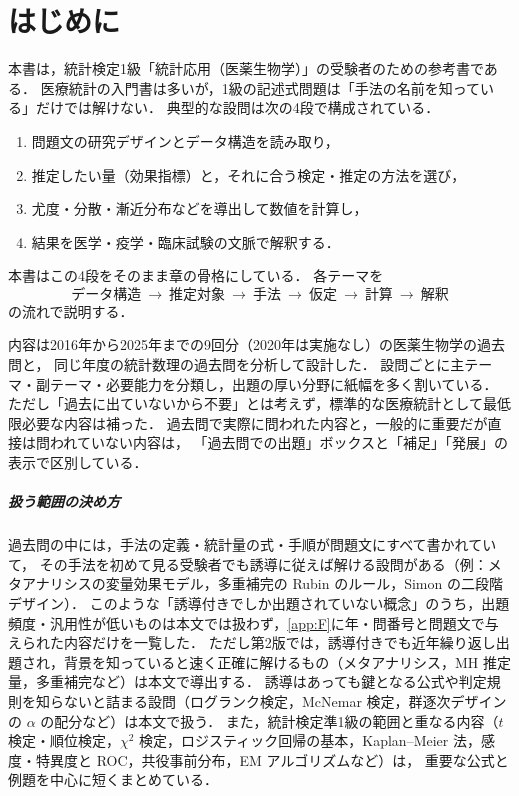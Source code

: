 \chapter*{はじめに}

本書は，統計検定1級「統計応用（医薬生物学）」の受験者のための参考書である．
医療統計の入門書は多いが，1級の記述式問題は「手法の名前を知っている」だけでは解けない．
典型的な設問は次の4段で構成されている．
\begin{enumerate}[label=(\arabic*)]
\item 問題文の研究デザインとデータ構造を読み取り，
\item 推定したい量（効果指標）と，それに合う検定・推定の方法を選び，
\item 尤度・分散・漸近分布などを導出して数値を計算し，
\item 結果を医学・疫学・臨床試験の文脈で解釈する．
\end{enumerate}
本書はこの4段をそのまま章の骨格にしている．
各テーマを
\[
\boxed{\ \text{データ構造}\ \rightarrow\ \text{推定対象}\ \rightarrow\ \text{手法}\ \rightarrow\ \text{仮定}\ \rightarrow\ \text{計算}\ \rightarrow\ \text{解釈}\ }
\]
の流れで説明する．

内容は2016年から2025年までの9回分（2020年は実施なし）の医薬生物学の過去問と，
同じ年度の統計数理の過去問を分析して設計した．
設問ごとに主テーマ・副テーマ・必要能力を分類し，出題の厚い分野に紙幅を多く割いている．
ただし「過去に出ていないから不要」とは考えず，標準的な医療統計として最低限必要な内容は補った．
過去問で実際に問われた内容と，一般的に重要だが直接は問われていない内容は，
「過去問での出題」ボックスと「補足」「発展」の表示で区別している．

\paragraph{扱う範囲の決め方}
過去問の中には，手法の定義・統計量の式・手順が問題文にすべて書かれていて，
その手法を初めて見る受験者でも誘導に従えば解ける設問がある（例：メタアナリシスの変量効果モデル，多重補完の Rubin のルール，Simon の二段階デザイン）．
このような「誘導付きでしか出題されていない概念」のうち，出題頻度・汎用性が低いものは本文では扱わず，\cref{app:F}に年・問番号と問題文で与えられた内容だけを一覧した．
ただし第2版では，誘導付きでも近年繰り返し出題され，背景を知っていると速く正確に解けるもの（メタアナリシス，MH 推定量，多重補完など）は本文で導出する．
誘導はあっても鍵となる公式や判定規則を知らないと詰まる設問（ログランク検定，McNemar 検定，群逐次デザインの $\alpha$ の配分など）は本文で扱う．
また，統計検定準1級の範囲と重なる内容（$t$ 検定・順位検定，$\chi^2$ 検定，ロジスティック回帰の基本，Kaplan--Meier 法，感度・特異度と ROC，共役事前分布，EM アルゴリズムなど）は，
重要な公式と例題を中心に短くまとめている．

